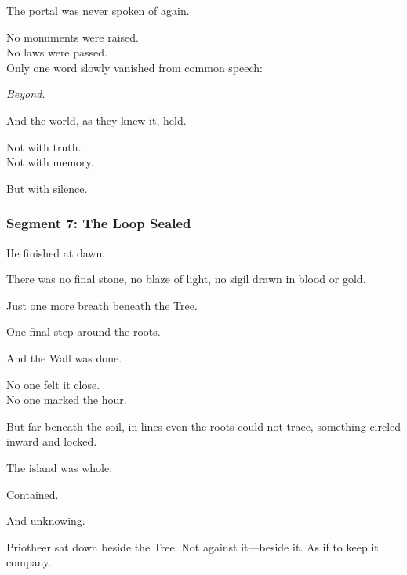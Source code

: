 \documentclass[9pt]{article}
\begin{document}
\vspace{0.5em}
The portal was never spoken of again.

\vspace{0.5em}
No monuments were raised.\\
No laws were passed.\\
Only one word slowly vanished from common speech:

\vspace{0.5em}
\textit{Beyond.}

\vspace{0.5em}
And the world, as they knew it, held.

\vspace{0.5em}
Not with truth.\\
Not with memory.

\vspace{0.5em}
But with silence.

\newpage

\subsubsection*{Segment 7: The Loop Sealed}

He finished at dawn.

\vspace{0.5em}
There was no final stone, no blaze of light, no sigil drawn in blood or gold.

\vspace{0.5em}
Just one more breath beneath the Tree.

\vspace{0.5em}
One final step around the roots.

\vspace{0.5em}
And the Wall was done.

\vspace{0.5em}
No one felt it close.\\
No one marked the hour.

\vspace{0.5em}
But far beneath the soil, in lines even the roots could not trace, something circled inward and locked.

\vspace{0.5em}
The island was whole.

\vspace{0.5em}
Contained.

\vspace{0.5em}
And unknowing.

\vspace{0.5em}
Priotheer sat down beside the Tree. Not against it---beside it. As if to keep it company.
\end{document}
